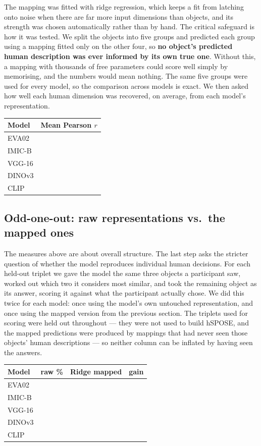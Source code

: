 \documentclass[11pt]{article}
\begin{document}
The mapping was fitted with ridge regression, which keeps a fit from latching onto noise when there
are far more input dimensions than objects, and its strength was chosen automatically rather than by
hand. The critical safeguard is how it was tested. We split the objects into five groups and
predicted each group using a mapping fitted only on the other four, so \textbf{no object's predicted
human description was ever informed by its own true one}. Without this, a mapping with thousands of
free parameters could score well simply by memorising, and the numbers would mean nothing. The same
five groups were used for every model, so the comparison across models is exact. We then asked how
well each human dimension was recovered, on average, from each model's representation.

\begin{center}
\begin{tabular}{@{}lc@{}}
\toprule
\textbf{Model} & \textbf{Mean Pearson }$r$ \\
\midrule
EVA02 & \\
IMIC-B & \\
VGG-16 & \\
DINOv3 & \\
CLIP & \\
\bottomrule
\end{tabular}
\end{center}

\subsection{Odd-one-out: raw representations vs.\ the mapped ones}

The measures above are about overall structure. The last step asks the stricter question of whether
the model reproduces individual human decisions. For each held-out triplet we gave the model the
same three objects a participant saw, worked out which two it considers most similar, and took the
remaining object as its answer, scoring it against what the participant actually chose. We did this
twice for each model: once using the model's own untouched representation, and once using the mapped
version from the previous section. The triplets used for scoring were held out throughout --- they
were not used to build hSPOSE, and the mapped predictions were produced by mappings that had never
seen those objects' human descriptions --- so neither column can be inflated by having seen the
answers.

\begin{center}
\begin{tabular}{@{}lccc@{}}
\toprule
\textbf{Model} & \textbf{raw \%} & \textbf{Ridge mapped} & \textbf{gain} \\
\midrule
EVA02 & & & \\
IMIC-B & & & \\
VGG-16 & & & \\
DINOv3 & & & \\
CLIP & & & \\
\bottomrule
\end{tabular}
\end{center}
\end{document}
